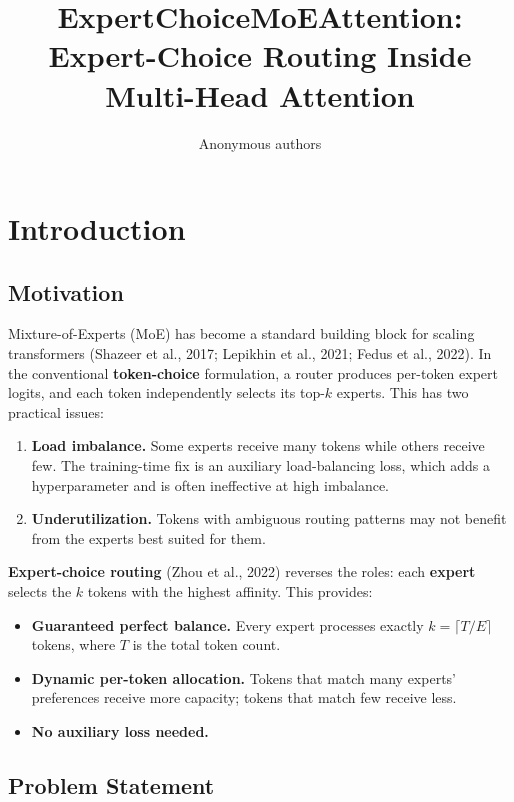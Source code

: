 \title{\textbf{ExpertChoiceMoEAttention: Expert-Choice Routing Inside Multi-Head Attention}}

\author{Anonymous authors}


\section{Introduction}

\subsection{Motivation}

Mixture-of-Experts (MoE) has become a standard building block for scaling 
transformers (Shazeer et al., 2017; Lepikhin et al., 2021; Fedus et al., 
2022). In the conventional \textbf{token-choice} formulation, a router produces 
per-token expert logits, and each token independently selects its top-$k$ 
experts. This has two practical issues:

\begin{enumerate}
\item \textbf{Load imbalance.} Some experts receive many tokens while others receive
  few. The training-time fix is an auxiliary load-balancing loss, which
  adds a hyperparameter and is often ineffective at high imbalance.
\item \textbf{Underutilization.} Tokens with ambiguous routing patterns may not
  benefit from the experts best suited for them.

\end{enumerate}
\textbf{Expert-choice routing} (Zhou et al., 2022) reverses the roles: each 
\textbf{expert} selects the $k$ tokens with the highest affinity. This 
provides:

\begin{itemize}
\item \textbf{Guaranteed perfect balance.} Every expert processes exactly
  $k = \lceil T / E \rceil$ tokens, where $T$ is the total token count.
\item \textbf{Dynamic per-token allocation.} Tokens that match many experts'
  preferences receive more capacity; tokens that match few receive less.
\item \textbf{No auxiliary loss needed.}

\end{itemize}
\subsection{Problem Statement}


